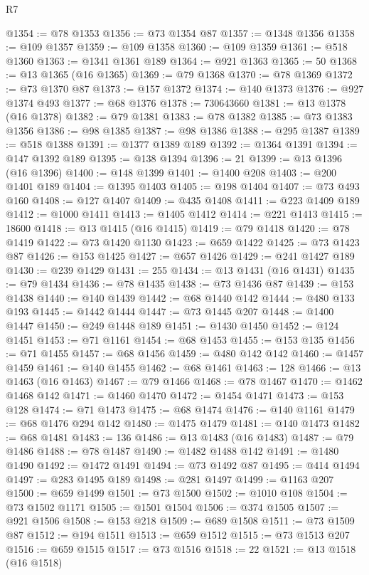 \begin{lexlean}{R7}
\begin{coremodule}
@1354 := @78 @1353
@1356 := @73 @1354 @87
@1357 := @1348 @1356
@1358 := @109 @1357
@1359 := @109 @1358
@1360 := @109 @1359
@1361 := @518 @1360
@1363 := @1341 @1361 @189
@1364 := @921 @1363
@1365 := 50
@1368 := @13 @1365 (@16 @1365)
@1369 := @79 @1368
@1370 := @78 @1369
@1372 := @73 @1370 @87
@1373 := @157 @1372
@1374 := @140 @1373
@1376 := @927 @1374 @493
@1377 := @68 @1376
@1378 := 730643660
@1381 := @13 @1378 (@16 @1378)
@1382 := @79 @1381
@1383 := @78 @1382
@1385 := @73 @1383 @1356
@1386 := @98 @1385
@1387 := @98 @1386
@1388 := @295 @1387
@1389 := @518 @1388
@1391 := @1377 @1389 @189
@1392 := @1364 @1391
@1394 := @147 @1392 @189
@1395 := @138 @1394
@1396 := 21
@1399 := @13 @1396 (@16 @1396)
@1400 := @148 @1399
@1401 := @1400 @208
@1403 := @200 @1401 @189
@1404 := @1395 @1403
@1405 := @198 @1404
@1407 := @73 @493 @160
@1408 := @127 @1407
@1409 := @435 @1408
@1411 := @223 @1409 @189
@1412 := @1000 @1411
@1413 := @1405 @1412
@1414 := @221 @1413
@1415 := 18600
@1418 := @13 @1415 (@16 @1415)
@1419 := @79 @1418
@1420 := @78 @1419
@1422 := @73 @1420 @1130
@1423 := @659 @1422
@1425 := @73 @1423 @87
@1426 := @153 @1425
@1427 := @657 @1426
@1429 := @241 @1427 @189
@1430 := @239 @1429
@1431 := 255
@1434 := @13 @1431 (@16 @1431)
@1435 := @79 @1434
@1436 := @78 @1435
@1438 := @73 @1436 @87
@1439 := @153 @1438
@1440 := @140 @1439
@1442 := @68 @1440 @142
@1444 := @480 @133 @193
@1445 := @1442 @1444
@1447 := @73 @1445 @207
@1448 := @1400 @1447
@1450 := @249 @1448 @189
@1451 := @1430 @1450
@1452 := @124 @1451
@1453 := @71 @1161
@1454 := @68 @1453
@1455 := @153 @135
@1456 := @71 @1455
@1457 := @68 @1456
@1459 := @480 @142 @142
@1460 := @1457 @1459
@1461 := @140 @1455
@1462 := @68 @1461
@1463 := 128
@1466 := @13 @1463 (@16 @1463)
@1467 := @79 @1466
@1468 := @78 @1467
@1470 := @1462 @1468 @142
@1471 := @1460 @1470
@1472 := @1454 @1471
@1473 := @153 @128
@1474 := @71 @1473
@1475 := @68 @1474
@1476 := @140 @1161
@1479 := @68 @1476 @294 @142
@1480 := @1475 @1479
@1481 := @140 @1473
@1482 := @68 @1481
@1483 := 136
@1486 := @13 @1483 (@16 @1483)
@1487 := @79 @1486
@1488 := @78 @1487
@1490 := @1482 @1488 @142
@1491 := @1480 @1490
@1492 := @1472 @1491
@1494 := @73 @1492 @87
@1495 := @414 @1494
@1497 := @283 @1495 @189
@1498 := @281 @1497
@1499 := @1163 @207
@1500 := @659 @1499
@1501 := @73 @1500
@1502 := @1010 @108
@1504 := @73 @1502 @1171
@1505 := @1501 @1504
@1506 := @374 @1505
@1507 := @921 @1506
@1508 := @153 @218
@1509 := @689 @1508
@1511 := @73 @1509 @87
@1512 := @194 @1511
@1513 := @659 @1512
@1515 := @73 @1513 @207
@1516 := @659 @1515
@1517 := @73 @1516
@1518 := 22
@1521 := @13 @1518 (@16 @1518)

\end{coremodule}
\end{lexlean}
